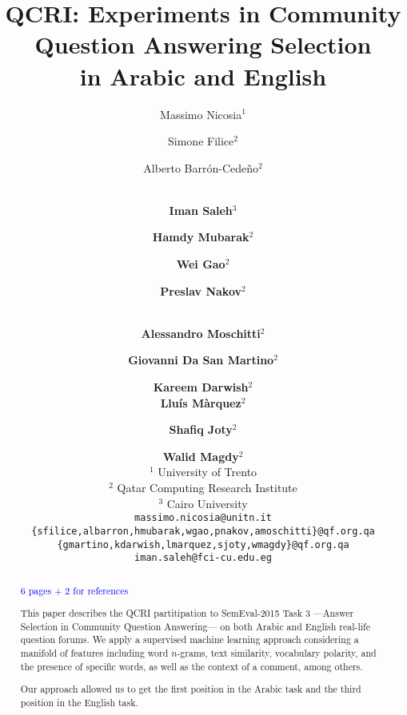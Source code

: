 \documentclass[11pt,letterpaper]{article}
\title{QCRI: Experiments in Community Question Answering Selection \\in Arabic 
and English
}
\author{%
Massimo Nicosia$^1$ \and Simone Filice$^2$ \and Alberto Barr\'on-Cede\~no$^2$ 
\and \\
{\bf Iman Saleh}$^3$  \and {\bf Hamdy Mubarak}$^2$ \and {\bf Wei Gao$^2$} \and 
{\bf Preslav Nakov$^2$}
\and \\
{\bf Alessandro Moschitti$^2$} \and {\bf Giovanni Da San Martino}$^2$	
\and  {\bf Kareem Darwish$^2$} \\ 
{\bf Llu\'is M\`arquez$^2$}  \and  
{\bf Shafiq Joty$^2$} \and {\bf Walid Magdy$^2$} \\
$^1$ University of Trento \\
$^2$ Qatar Computing Research Institute	\\
$^3$ Cairo University \\
{\tt massimo.nicosia@unitn.it}	\\
{\tt \{sfilice,albarron,hmubarak,wgao,pnakov,amoschitti\}@qf.org.qa} 	\\
{\tt \{gmartino,kdarwish,lmarquez,sjoty,wmagdy\}@qf.org.qa}	
\\
{\tt iman.saleh@fci-cu.edu.eg} 
% 
% 
% 
% 
% 
}
\date{}
\newcommand{\blue}{\textcolor{blue}}
\begin{document}
\maketitle
\begin{abstract}

\blue{6 pages + 2 for references}

This paper describes the QCRI partitipation to SemEval-2015 Task 3 ---Answer 
Selection in Community Question Answering--- on both Arabic and English 
real-life question forums. We apply a supervised machine learning approach 
considering a manifold of features including word $n$-grams, text similarity, 
vocabulary polarity, and the presence of specific words, as well as the 
context of a comment, 
among others.

Our approach allowed us to get the first position in the Arabic task and the 
third position in the English task.
\end{abstract}


% 














% 
% 
% 
% 

\end{document}
